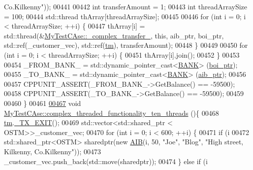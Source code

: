 \begin{DoxyCode}
{       Co.Kilkenny"}));
00441     
00442     \textcolor{keywordtype}{int} transferAmount = 1;
00443     \textcolor{keywordtype}{int} threadArraySize = 100; 
00444     std::thread thArray[threadArraySize];
00445    
00446     \textcolor{keywordflow}{for} (\textcolor{keywordtype}{int} i = 0; i < threadArraySize; ++i) \{
00447         thArray[i] = std::thread(&\hyperlink{class_my_test_c_ase_a2367b87338c4f61cc3ac3193651580d4_a2367b87338c4f61cc3ac3193651580d4}{MyTestCAse::\_complex\_transfer\_}, \textcolor{keyword}{this}, 
      aib\_ptr, boi\_ptr, std::ref(\_customer\_vec),  std::ref(\hyperlink{class_my_test_c_ase_a422e6e5d4ddedea384be96031c89b72b_a422e6e5d4ddedea384be96031c89b72b}{tm}), transferAmount);
00448     \}
00449     
00450     \textcolor{keywordflow}{for} (\textcolor{keywordtype}{int} i = 0; i < threadArraySize; ++i) \{
00451         thArray[i].join();
00452     \}
00453     
00454     \_FROM\_BANK\_ = std::dynamic\_pointer\_cast<\hyperlink{class_b_a_n_k}{BANK}> (\hyperlink{class_my_test_c_ase_a5554de9e3e6393a89c66c036c529720b_a5554de9e3e6393a89c66c036c529720b}{boi\_ptr});
00455     \_TO\_BANK\_ = std::dynamic\_pointer\_cast<\hyperlink{class_b_a_n_k}{BANK}> (\hyperlink{class_my_test_c_ase_adad50e8278b64aa0321000b528e5362c_adad50e8278b64aa0321000b528e5362c}{aib\_ptr});
00456     
00457     CPPUNIT\_ASSERT(\_FROM\_BANK\_->GetBalance() == -59500);
00458     CPPUNIT\_ASSERT(\_TO\_BANK\_->GetBalance() == -59500);
00459     
00460 \}
00461 
\hypertarget{_my_test_c_ase_8cpp_source.tex_l00467}{}\hyperlink{class_my_test_c_ase_ad91f8c37cd32055b834c84f10edeb979_ad91f8c37cd32055b834c84f10edeb979}{00467} \textcolor{keywordtype}{void} \hyperlink{class_my_test_c_ase_ad91f8c37cd32055b834c84f10edeb979_ad91f8c37cd32055b834c84f10edeb979}{MyTestCAse::complex\_threaded\_functionality\_ten\_threads}
      ()\{
00468     \hyperlink{class_my_test_c_ase_a422e6e5d4ddedea384be96031c89b72b_a422e6e5d4ddedea384be96031c89b72b}{tm}.\hyperlink{class_t_m_a5e2d1127f2429f2f524d25f430eade06_a5e2d1127f2429f2f524d25f430eade06}{\_TX\_EXIT}();
00469     std::vector<std::shared\_ptr < OSTM>>\_customer\_vec; 
00470      \textcolor{keywordflow}{for} (\textcolor{keywordtype}{int} i = 0; i < 600; ++i) \{
00471         \textcolor{keywordflow}{if} (i %
00472             std::shared\_ptr<OSTM> sharedptr(\textcolor{keyword}{new} \hyperlink{class_a_i_b}{AIB}(i, 50, \textcolor{stringliteral}{"Joe"}, \textcolor{stringliteral}{"Blog"}, \textcolor{stringliteral}{"High street, Kilkenny,
       Co.Kilkenny"}));
00473             \_customer\_vec.push\_back(std::move(sharedptr));
00474         \} \textcolor{keywordflow}{else} \textcolor{keywordflow}{if} (i %

\end{DoxyCode}

